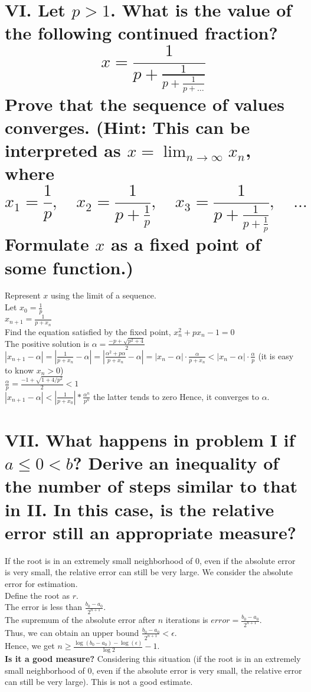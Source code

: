 \documentclass[a4paper]{article}
\begin{document}
\section*{VI. Let \( p > 1 \). What is the value of the following continued fraction?
\[
x = \frac{1}{p + \frac{1}{p + \frac{1}{p + \ldots}}}
\]
Prove that the sequence of values converges. (Hint: This can be interpreted as \( x = \lim_{n \to \infty} x_n \), where 
\[
x_1 = \frac{1}{p}, \quad x_2 = \frac{1}{p + \frac{1}{p}}, \quad x_3 = \frac{1}{p + \frac{1}{p + \frac{1}{p}}}, \quad \ldots
\]
Formulate \( x \) as a fixed point of some function.)}

Represent \( x \) using the limit of a sequence.\\
Let \( x_0 = \frac{1}{p} \)\\
\( x_{n+1} = \frac{1}{p + x_n} \)\\
Find the equation satisfied by the fixed point, \( x_n^2 + px_n - 1 = 0 \)\\
The positive solution is \( \alpha = \frac{-p + \sqrt{p^2 + 4}}{2} \)\\
\( |x_{n+1} - \alpha| = \left|\frac{1}{p + x_n} - \alpha\right| = \left|\frac{\alpha^2 + p\alpha}{p + x_n} - \alpha\right| = |x_n - \alpha| \cdot \frac{\alpha}{p + x_n} < |x_n - \alpha| \cdot \frac{\alpha}{p} \) (it is easy to know \( x_n > 0 \))\\
\( \frac{\alpha}{p} = \frac{-1 + \sqrt{1 + 4/p^2}}{2} < 1 \)\\
\( |x_{n+1} - \alpha| \lt |\frac{1}{p + x_0}|*\frac{\alpha^n}{p^n} \) the latter tends to zero
Hence, it converges to \( \alpha \).

\section*{VII. What happens in problem I if \( a \leq 0 < b \)? Derive an inequality of the number of steps similar to that in II. In this case, is the relative error still an appropriate measure?}

If the root is in an extremely small neighborhood of 0, even if the absolute error is very small, the relative error can still be very large.
We consider the absolute error for estimation.\\
Define the root as \( r \).\\
The error is less than \( \frac{b_0-a_0}{2^{n+1}} \).\\
The supremum of the absolute error after \( n \) iterations is \( error = \frac{b_0-a_0}{2^{n+1}} \).\\
Thus, we can obtain an upper bound \( \frac{b_0-a_0}{2^{n+1}} < \epsilon \).\\
Hence, we get \( n \geq \frac{\log(b_0-a_0) - \log(\epsilon)}{\log 2} - 1 \).\\
\textbf{Is it a good measure?}
Considering this situation (if the root is in an extremely small neighborhood of 0, even if the absolute error is very small, the relative error can still be very large).
This is not a good estimate.
\end{document}
